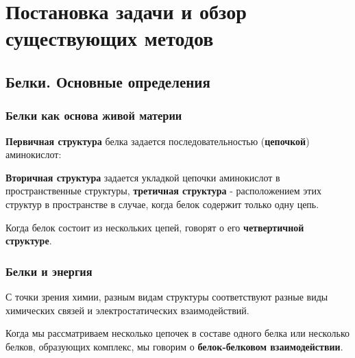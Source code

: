 \graphicspath{{../images/intro/}}
\chapter{Постановка задачи и обзор существующих методов}
\section{Белки. Основные определения}

\subsection{Белки как основа живой материи}
\textbf{Первичная структура} белка задается последовательностью (\textbf{цепочкой}) аминокислот:


\textbf{Вторичная структура} задается укладкой цепочки аминокислот в пространственные структуры, \textbf{третичная структура} - расположением этих структур в пространстве в случае, когда белок содержит только одну цепь.

Когда белок состоит из нескольких цепей, говорят о его \textbf{четвертичной структуре}.

\subsection{Белки и энергия}
С точки зрения химии, разным видам структуры соответствуют разные виды химических связей и электростатических взаимодействий.

Когда мы рассматриваем несколько цепочек в составе одного белка или несколько белков, образующих комплекс, мы говорим о \textbf{белок-белковом взаимодействии}.

